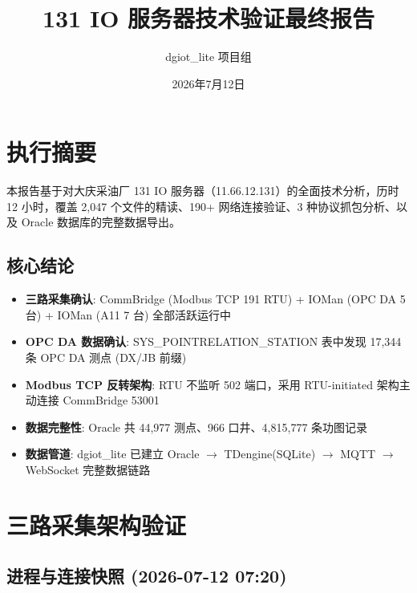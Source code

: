 \documentclass[12pt,a4paper]{ctexart}
\title{\textbf{131 IO 服务器技术验证最终报告}}
\author{dgiot\_lite 项目组}
\date{2026年7月12日}
\begin{document}
\maketitle
\tableofcontents
\newpage

\section{执行摘要}

本报告基于对大庆采油厂 131 IO 服务器（11.66.12.131）的全面技术分析，历时 12 小时，覆盖 2,047 个文件的精读、190+ 网络连接验证、3 种协议抓包分析、以及 Oracle 数据库的完整数据导出。

\subsection{核心结论}
\begin{itemize}[leftmargin=*]
  \item \textbf{三路采集确认}: CommBridge (Modbus TCP 191 RTU) + IOMan (OPC DA 5 台) + IOMan (A11 7 台) 全部活跃运行中
  \item \textbf{OPC DA 数据确认}: SYS\_POINTRELATION\_STATION 表中发现 17,344 条 OPC DA 测点 (DX/JB 前缀)
  \item \textbf{Modbus TCP 反转架构}: RTU 不监听 502 端口，采用 RTU-initiated 架构主动连接 CommBridge 53001
  \item \textbf{数据完整性}: Oracle 共 44,977 测点、966 口井、4,815,777 条功图记录
  \item \textbf{数据管道}: dgiot\_lite 已建立 Oracle $\rightarrow$ TDengine(SQLite) $\rightarrow$ MQTT $\rightarrow$ WebSocket 完整数据链路
\end{itemize}

\section{三路采集架构验证}

\subsection{进程与连接快照 (2026-07-12 07:20)}
\end{document}
